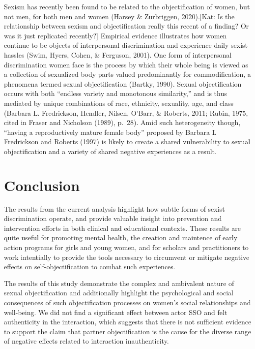\documentclass[man]{apa6}
\begin{document}
Sexism has recently been found to be related to the objectification of
women, but not men, for both men and women (Harsey \& Zurbriggen,
2020).{[}Kat: Is the relationship between sexism and objectification
really this recent of a finding? Or was it just replicated recently?{]}
Empirical evidence illustrates how women continue to be objects of
interpersonal discrimination and experience daily sexist hassles (Swim,
Hyers, Cohen, \& Ferguson, 2001). One form of interpersonal
discrimination women face is the process by which their whole being is
viewed as a collection of sexualized body parts valued predominantly for
commodification, a phenomena termed sexual objectification (Bartky,
1990). Sexual objectification occurs with both \enquote{endless variety
and monotonous similarity,} and is thus mediated by unique combinations
of race, ethnicity, sexuality, age, and class (Barbara L. Fredrickson,
Hendler, Nilsen, O'Barr, \& Roberts, 2011; Rubin, 1975, cited in Fraser
and Nicholson (1989), p.~28). Amid such heterogeneity though,
\enquote{having a reproductively mature female body} proposed by Barbara
L Fredrickson and Roberts (1997) is likely to create a shared
vulnerability to sexual objectification and a variety of shared negative
experiences as a result.

\section{Conclusion}\label{conclusion}

The results from the current analysis highlight how subtle forms of
sexist discrimination operate, and provide valuable insight into
prevention and intervention efforts in both clinical and educational
contexts. These results are quite useful for promoting mental health,
the creation and maintence of early action programs for girls and young
women, and for scholars and practitioners to work intentially to provide
the tools necessary to circumvent or mitigate negative effects on
self-objectification to combat such experiences.

The results of this study demonstrate the complex and ambivalent nature
of sexual objectification and additionally highlight the psychological
and social consequences of such objectification processes on women's
social relationships and well-being. We did not find a significant
effect between actor SSO and felt authenticity in the interaction, which
suggests that there is not sufficient evidence to support the claim that
partner objectification is the cause for the diverse range of negative
effects related to interaction inauthenticity.
\end{document}
